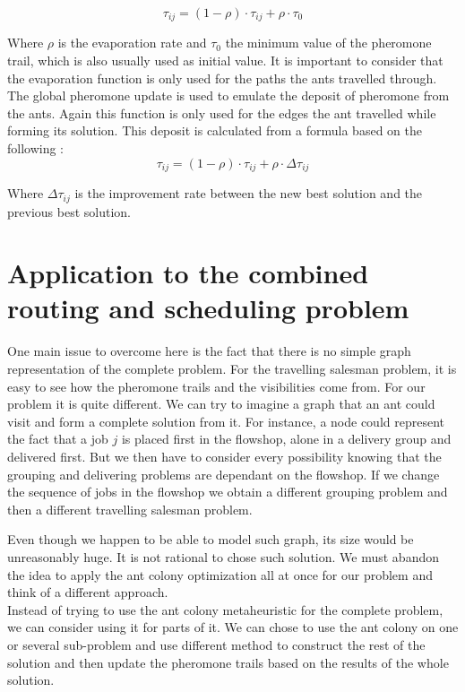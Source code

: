 \documentclass[UTF8, twoside]{EPURapport}
\begin{document}
\[
\tau_{ij} = (1-\rho) \cdot \tau_{ij}+\rho \cdot \tau_{0}
\]

	Where $\rho$ is the evaporation rate and $\tau_{0}$ the minimum value of the pheromone trail, which is also usually used as initial value. It is important to consider that the evaporation function is only used for the paths the ants travelled through.
\\

	The global pheromone update is used to emulate the deposit of pheromone from the ants. Again this function is only used for the edges the ant travelled while forming its solution. This deposit is calculated from a formula based on the following :
	\\
	
\[
\tau_{ij} = (1-\rho) \cdot \tau_{ij}+\rho \cdot \Delta\tau_{ij}
\]

	Where $\Delta\tau_{ij}$ is the improvement rate between the new best solution and the previous best solution.

\section{Application to the combined routing and scheduling problem}

	\hspace{4ex}One main issue to overcome here is the fact that there is no simple graph representation of the complete problem. For the travelling salesman problem, it is easy to see how the pheromone trails and the visibilities come from. For our problem it is quite different. We can try to imagine a graph that an ant could visit and form a complete solution from it. For instance, a node could represent the fact that a job $j$ is placed first in the flowshop, alone in a delivery group and delivered first. But we then have to consider every possibility knowing that the grouping and delivering problems are dependant on the flowshop. If we change the sequence of jobs in the flowshop we obtain a different grouping problem and then a different travelling salesman problem.
	
	Even though we happen to be able to model such graph, its size would be unreasonably huge. It is not rational to chose such solution. We must abandon the idea to apply the ant colony optimization all at once for our problem and think of a different approach.
	\\
	
	Instead of trying to use the ant colony metaheuristic for the complete problem, we can consider using it for parts of it. We can chose to use the ant colony on one or several sub-problem and use different method to construct the rest of the solution and then update the pheromone trails based on the results of the whole solution.
	
\end{document}
